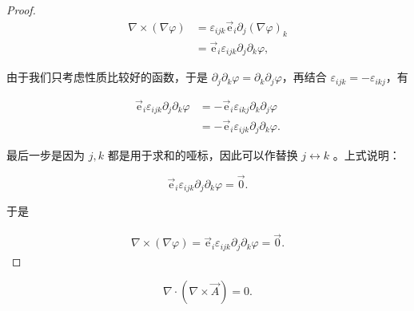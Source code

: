 \begin{proof}

\begin{equation}
\begin{split}
\nabla\times(\nabla \varphi)
&=\varepsilon_{ijk} \vec{\mathrm{e}}_i\partial_j (\nabla\varphi)_k \\
&=\vec{\mathrm{e}}_i\varepsilon_{ijk} \partial_j\partial_k\varphi,
\end{split}
\end{equation}

由于我们只考虑性质比较好的函数，于是 $\partial_j \partial_k\varphi=\partial_k\partial_j\varphi $，再结合 $\varepsilon_{ijk}=-\varepsilon_{ikj} $，有

\begin{equation}
\begin{split}
\vec{\mathrm{e}}_i\varepsilon_{ijk}\partial_j\partial_k\varphi
&=-\vec{\mathrm{e}}_i\varepsilon_{ikj}\partial_k\partial_j\varphi \\
&=-\vec{\mathrm{e}}_i\varepsilon_{ijk}\partial_j\partial_k\varphi.
\end{split}
\end{equation}

最后一步是因为 $j,k $ 都是用于求和的哑标，因此可以作替换 $j \leftrightarrow k $ 。上式说明：

\begin{equation}
\vec{\mathrm{e}}_i\varepsilon_{ijk}\partial_j\partial_k\varphi
=\vec{0}.
\end{equation}

于是

\begin{equation}
\begin{split}
\nabla\times(\nabla \varphi)
=\vec{\mathrm{e}}_i\varepsilon_{ijk}\partial_j\partial_k\varphi
=\vec{0}.
\end{split}
\end{equation}

\end{proof}

\begin{example}
\begin{equation}
\nabla\cdot\left(\nabla\times \vec{A}\right)
=0.
\end{equation}
\end{example}

